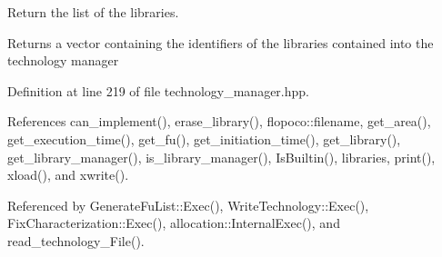 Return the list of the libraries. 

\begin{DoxyReturn}{Returns}
a vector containing the identifiers of the libraries contained into the technology manager 
\end{DoxyReturn}


Definition at line 219 of file technology\+\_\+manager.\+hpp.



References can\+\_\+implement(), erase\+\_\+library(), flopoco\+::filename, get\+\_\+area(), get\+\_\+execution\+\_\+time(), get\+\_\+fu(), get\+\_\+initiation\+\_\+time(), get\+\_\+library(), get\+\_\+library\+\_\+manager(), is\+\_\+library\+\_\+manager(), Is\+Builtin(), libraries, print(), xload(), and xwrite().



Referenced by Generate\+Fu\+List\+::\+Exec(), Write\+Technology\+::\+Exec(), Fix\+Characterization\+::\+Exec(), allocation\+::\+Internal\+Exec(), and read\+\_\+technology\+\_\+\+File().

